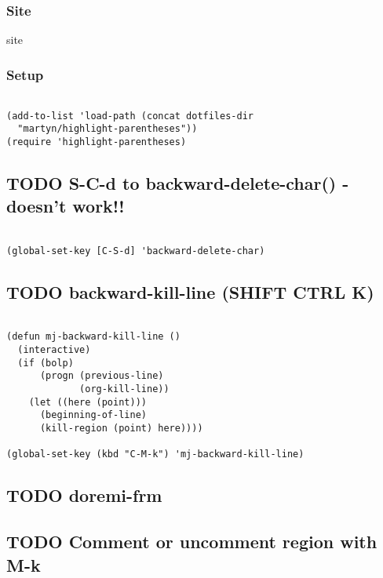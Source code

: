 \documentclass[colorlinks=true,urlcolor=blue,listings-sv]{article}
\begin{document}
{{{\subsubsection{Site}
\label{sec-2-38-1}

site
\subsubsection{Setup}
\label{sec-2-38-2}



\lstset{language=Lisp}
\begin{lstlisting}

(add-to-list 'load-path (concat dotfiles-dir 
  "martyn/highlight-parentheses"))
(require 'highlight-parentheses)
\end{lstlisting}
\subsection{\textbf{TODO} S-C-d to backward-delete-char() - doesn't work!!}
\label{sec-2-39}



\lstset{language=Lisp}
\begin{lstlisting}

(global-set-key [C-S-d] 'backward-delete-char)
\end{lstlisting}
\subsection{\textbf{TODO} backward-kill-line (SHIFT CTRL K)}
\label{sec-2-40}



\lstset{language=Lisp}
\begin{lstlisting}

(defun mj-backward-kill-line ()
  (interactive)
  (if (bolp) 
      (progn (previous-line)
             (org-kill-line))
    (let ((here (point)))
      (beginning-of-line)
      (kill-region (point) here))))

(global-set-key (kbd "C-M-k") 'mj-backward-kill-line)
\end{lstlisting}
\subsection{\textbf{TODO} doremi-frm}
\label{sec-2-41}
\subsection{\textbf{TODO} Comment or uncomment region with M-k}
\label{sec-2-42}
\label{54fe0628-6b92-4e51-b03b-c1610506f021}



}}}
\end{document}
